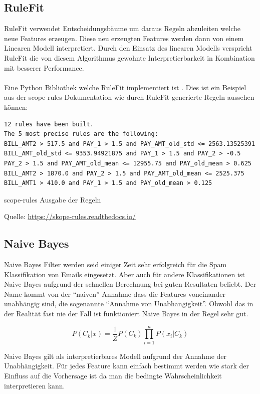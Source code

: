 \documentclass[
  12pt, %
  a4paper, %
  oneside, %
  openany, 
  numbers=noenddot, %
  BCOR=5mm, %
  parskip=half*, %
  thesis, %
]{bfhbook}
\begin{document}
\subsection{RuleFit}
\label{RF}
RuleFit \parencite{Friedman2008} verwendet Entscheidungsbäume um daraus Regeln abzuleiten welche neue Features erzeugen. Diese neu erzeugten Features werden dann von einem Linearen Modell interpretiert. Durch den Einsatz des linearen Modells verspricht RuleFit die von diesem Algorithmus gewohnte Interpretierbarkeit in Kombination mit besserer Performance.
\\\\
Eine Python Bibliothek welche RuleFit implementiert ist \parencite{scopeRules}. Dies ist ein Beispiel aus der scope-rules Dokumentation wie durch RuleFit generierte Regeln aussehen können:
\begin{minipage}[t]{\linewidth}
\begin{lstlisting}
12 rules have been built.
The 5 most precise rules are the following:
BILL_AMT2 > 517.5 and PAY_1 > 1.5 and PAY_AMT_old_std <= 2563.13525391
BILL_AMT_old_std <= 9353.94921875 and PAY_1 > 1.5 and PAY_2 > -0.5
PAY_2 > 1.5 and PAY_AMT_old_mean <= 12955.75 and PAY_old_mean > 0.625
BILL_AMT2 > 1870.0 and PAY_2 > 1.5 and PAY_AMT_old_mean <= 2525.375
BILL_AMT1 > 410.0 and PAY_1 > 1.5 and PAY_old_mean > 0.125
\end{lstlisting}
\caption {scope-rules Ausgabe der Regeln}
\caption*{Quelle: \url{https://skope-rules.readthedocs.io/}}
\end{minipage}

\subsection{Naive Bayes}
Naive Bayes Filter werden seid einiger Zeit sehr erfolgreich für die Spam Klassifikation von Emails eingesetzt. Aber auch für andere Klassifikationen ist Naive Bayes aufgrund der schnellen Berechnung bei guten Resultaten beliebt. Der Name kommt von der ``naiven'' Annahme dass die Features voneinander unabhängig sind, die sogenannte  ``Annahme von Unabhangigkeit''. Obwohl das in der Realität fast nie der Fall ist funktioniert Naive Bayes in der Regel sehr gut.

\[ P(C_k|x) = \frac{1}{Z}P(C_k) \prod_{i=1}^{n}  P(x_i|C_k) \]

Naive Bayes gilt als interpretierbares Modell aufgrund der Annahme der Unabhängigkeit. Für jedes Feature kann einfach bestimmt werden wie stark der Einfluss auf die Vorhersage ist da man die bedingte Wahrscheinlichkeit interpretieren kann.
\end{document}
